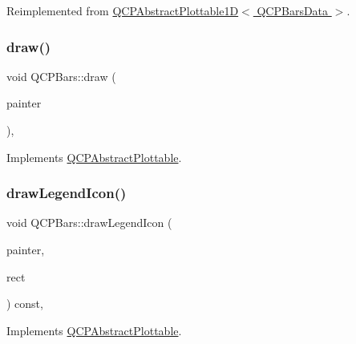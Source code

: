 Reimplemented from \hyperlink{class_q_c_p_abstract_plottable1_d_a6ca0699a6af5f25a7565de7c50ce13b2}{Q\+C\+P\+Abstract\+Plottable1\+D$<$ Q\+C\+P\+Bars\+Data $>$}.

\mbox{\label{class_q_c_p_bars_aa267c20650d55084c3f47cb2f8fac9dc}} 
\subsubsection{\texorpdfstring{draw()}{draw()}}
{\footnotesize\ttfamily void Q\+C\+P\+Bars\+::draw (\begin{DoxyParamCaption}\item[{\hyperlink{class_q_c_p_painter}{Q\+C\+P\+Painter} $\ast$}]{painter }\end{DoxyParamCaption})\hspace{0.3cm}{\ttfamily [protected]}, {\ttfamily [virtual]}}



Implements \hyperlink{class_q_c_p_abstract_plottable_a453f676a5cee7bf846c5f0fa05ea84b3}{Q\+C\+P\+Abstract\+Plottable}.

\mbox{\label{class_q_c_p_bars_aee7c3e1763fd6b504c45baa8775be7b7}} 
\subsubsection{\texorpdfstring{draw\+Legend\+Icon()}{drawLegendIcon()}}
{\footnotesize\ttfamily void Q\+C\+P\+Bars\+::draw\+Legend\+Icon (\begin{DoxyParamCaption}\item[{\hyperlink{class_q_c_p_painter}{Q\+C\+P\+Painter} $\ast$}]{painter,  }\item[{const Q\+RectF \&}]{rect }\end{DoxyParamCaption}) const\hspace{0.3cm}{\ttfamily [protected]}, {\ttfamily [virtual]}}



Implements \hyperlink{class_q_c_p_abstract_plottable_a9a450783fd9ed539e589999fd390cdf7}{Q\+C\+P\+Abstract\+Plottable}.

\mbox{\label{class_q_c_p_bars_a01b87e38e5d5089d214646d2af7896ea}} 
